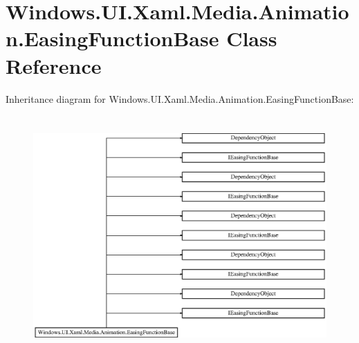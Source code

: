 \hypertarget{class_windows_1_1_u_i_1_1_xaml_1_1_media_1_1_animation_1_1_easing_function_base}{}\section{Windows.\+U\+I.\+Xaml.\+Media.\+Animation.\+Easing\+Function\+Base Class Reference}
\label{class_windows_1_1_u_i_1_1_xaml_1_1_media_1_1_animation_1_1_easing_function_base}
Inheritance diagram for Windows.\+U\+I.\+Xaml.\+Media.\+Animation.\+Easing\+Function\+Base\+:\begin{figure}[H]
\begin{center}
\leavevmode
\includegraphics[height=9.221557cm]{class_windows_1_1_u_i_1_1_xaml_1_1_media_1_1_animation_1_1_easing_function_base}
\end{center}
\end{figure}
